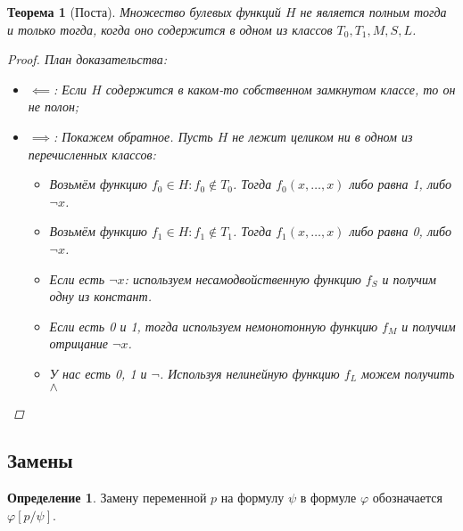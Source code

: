 \documentclass[12pt]{article}
\let\la\land
\let\n\neg
\let\nin\notin
\theoremstyle{definition}
\newtheorem{definition}{Определение}[section]
\theoremstyle{plain}
\newtheorem{theorem}{Теорема}[section]
\theoremstyle{remark}
\begin{document}
\begin{theorem}[Поста]
  Множество булевых функций $H$ не является полным тогда и только
  тогда, когда оно содержится в одном из классов $T_0, T_1, M, S, L$.
  \begin{proof}
    План доказательства:
    \begin{itemize}
      \item $\impliedby$: Если $H$ содержится в каком-то собственном
        замкнутом классе, то он не полон;

      \item $\implies$: Покажем обратное. Пусть $H$ не лежит целиком
        ни в одном из перечисленных классов:
        \begin{itemize}
          \item Возьмём функцию $f_0 \in H \colon f_0 \nin T_0$.
            Тогда $f_0(x, \dots, x)$ либо равна 1, либо $\n x$.

          \item Возьмём функцию $f_1 \in H \colon f_1 \nin T_1$.
            Тогда $f_1(x, \dots, x)$ либо равна 0, либо $\n x$.

          \item Если есть $\n x$: используем несамодвойственную
            функцию $f_S$ и получим одну из констант.

          \item Если есть 0 и 1, тогда используем немонотонную
            функцию $f_M$ и получим отрицание $\n x$.

          \item У нас есть 0, 1 и $\n$. Используя нелинейную функцию
            $f_L$ можем получить $\la$
        \end{itemize}
    \end{itemize}
  \end{proof}
\end{theorem}

\subsection{Замены}

\begin{definition}
  Замену переменной $p$ на формулу $\psi$ в формуле $\varphi$
  обозначается $\varphi[p/\psi]$.
\end{definition}
\end{document}
